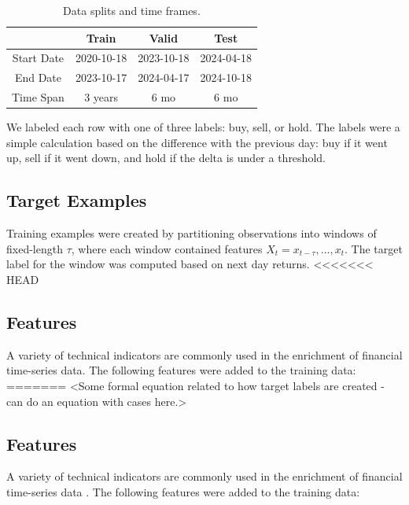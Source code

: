 \documentclass[10pt,twocolumn,letterpaper]{article}
\begin{document}
\begin{table}
\begin{center}
    \begin{tabular}{|c|c|c|c|}
\hline
        & Train & Valid & Test \\
\hline
        Start Date & 2020-10-18 & 2023-10-18 & 2024-04-18 \\
\hline
        End Date & 2023-10-17 & 2024-04-17 & 2024-10-18 \\
\hline
        Time Span & 3 years & 6 mo & 6 mo \\
\hline
\end{tabular}
\end{center}
    \caption{Data splits and time frames.}
\label{tab:trainingsplits}
\end{table}

We labeled each row with one of three labels: buy, sell, or hold. The labels were a simple calculation based on the difference with the previous day: buy if it went up, sell if it went down, and hold if the delta is under a threshold.

    \subsection{Target Examples}
    Training examples were created by partitioning observations into windows of fixed-length $\tau$, where each window contained features $X_t = x_{t - \tau},..., x_t$. The target label for the window was computed based on next day returns.
<<<<<<< HEAD

    \subsection{Features}
A variety of technical indicators are commonly used in the enrichment of financial time-series data\cite{zou_survey,stock_charts}. The following features were added to the training data: 
=======
<Some formal equation related to how target labels are created - can do an equation with cases here.> %

    \subsection{Features}
A variety of technical indicators are commonly used in the enrichment of financial time-series data \cite{insert some refs here}. The following features were added to the training data:
\end{document}
